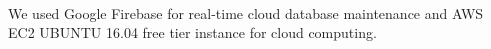 \paragraph{}We used Google Firebase for real-time cloud database maintenance and AWS EC2 UBUNTU 16.04 free tier instance for cloud computing.

